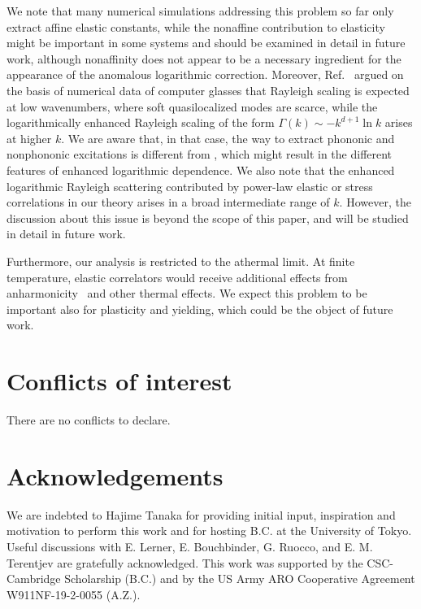 \documentclass[twoside,twocolumn,9pt]{article}
\begin{document}
We note that many numerical simulations addressing this problem so far only extract affine elastic constants, while the nonaffine contribution to elasticity~\cite{Lemaitre2006, Scossa-Romano, Zaccone2013,Mizuno2013} might be important in some systems and should be examined in detail in future work, although nonaffinity does not appear to be a necessary ingredient for the appearance of the anomalous logarithmic correction. Moreover, Ref.~\cite{Moriel2019} argued on the basis of numerical data of computer glasses that Rayleigh scaling is expected at low wavenumbers, where soft quasilocalized modes are scarce, while the logarithmically enhanced Rayleigh scaling of the form $\Gamma(k)\sim -k^{d+1}\ln k$ arises at higher $k$. We are aware that, in that case, the way to extract phononic and nonphononic excitations is different from \cite{Mizuno2018}, which might result in the different features of enhanced logarithmic dependence. We also note that the enhanced logarithmic Rayleigh scattering contributed by power-law elastic or stress correlations in our theory arises in a broad intermediate range of $k$. However, the discussion about this issue is beyond the scope of this paper, and will be studied in detail in future work.


Furthermore, our analysis is restricted to the athermal limit. At finite temperature, elastic correlators would receive additional effects from anharmonicity~\cite{Ruocco2019,Baggioli} and other thermal effects. We expect this problem to be important also for plasticity and yielding, which could be the object of future work.\\

\section*{Conflicts of interest}
There are no conflicts to declare.

\section*{Acknowledgements}
We are indebted to Hajime Tanaka for providing initial input, inspiration and motivation to perform this work and for hosting B.C. at the University of Tokyo. Useful discussions with E. Lerner, E. Bouchbinder, G. Ruocco, and E. M. Terentjev are gratefully acknowledged. This work was supported by the CSC-Cambridge Scholarship (B.C.) and by the US Army ARO Cooperative Agreement W911NF-19-2-0055 (A.Z.).\\
\end{document}
